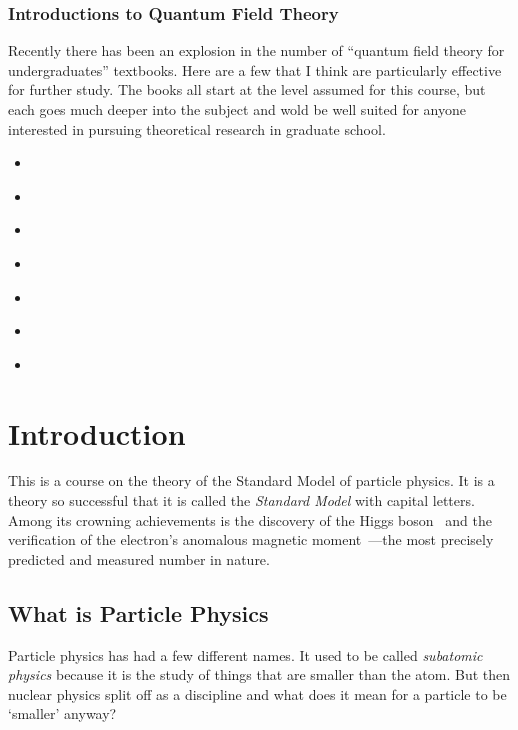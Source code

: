 \documentclass[12pt, oneside]{report}    %
\let\oldsection\section
\def\section{%
  \setcounter{sidenote}{1}%
  \oldsection
}
\begin{document}
\subsection{Introductions to Quantum Field Theory}
Recently there has been an explosion in the number of ``quantum field theory for undergraduates'' textbooks. Here are a few that I think are particularly effective for further study. The books all start at the level assumed for this course, but each goes much deeper into the subject and wold be well suited for anyone interested in pursuing theoretical research in graduate school.
\begin{itemize}
    \item \cite{Schwichtenberg:2018dri}
    \item \cite{schwichtenberg2020no}
    \item \cite{Lancaster:2014pza}
    \item \cite{donoghue2022prelude}
    \item \cite{Zee:2010qce}
    \item \cite{Feynman:1986er}
    \item \cite{Veltman:1994wz}
\end{itemize}

\chapter{Introduction}

This is a course on the theory of the Standard Model of particle physics. It is a theory so successful that it is called the \emph{Standard Model} with capital letters. Among its crowning achievements is the discovery of the Higgs boson~\autocite{CMS:2012zhx, ATLAS:2012ae} and the verification of the electron's anomalous magnetic moment~\autocite{Fan:2022eto}---the most precisely predicted and measured number in nature.

\section{What is Particle Physics}

Particle physics has had a few different names. It used to be called \emph{subatomic physics} because it is the study of things that are smaller than the atom. But then nuclear physics split off as a discipline and what does it mean for a particle to be `smaller' anyway?
\end{document}
